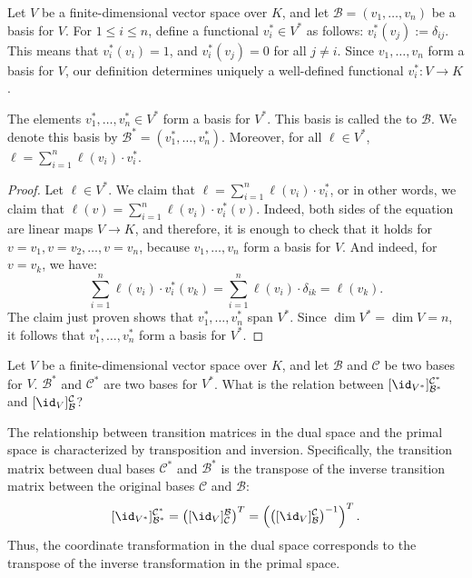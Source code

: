 Let $V$ be a finite-dimensional vector space over $K$, and let $\mathcal{B} = (v_1, \dots, v_n)$ be a basis for $V$. For $1 \leq i \leq n$, define a functional $v_i^* \in V^*$ as follows: $v_i^*(v_j) := \delta_{ij}$. This means that $v_i^*(v_i) = 1$, and $v_i^*(v_j) = 0$ for all $j \neq i$. Since $v_1, \dots, v_n$ form a basis for $V$, our definition determines uniquely a well-defined functional $v_i^* \colon V \to K$.

\begin{lemma}
  The elements $v_1^*, \dots, v_n^* \in V^*$ form a basis for $V^*$. This basis is called the  to $\mathcal{B}$. We denote this basis by $\mathcal{B}^* = (v_1^*, \dots, v_n^*)$. Moreover, for all $\ell \in V^*$, $\ell = \sum_{i=1}^n \ell(v_i) \cdot v_i^*$.
\end{lemma}

\begin{proof}
  Let $\ell \in V^*$. We claim that $\ell = \sum_{i=1}^n \ell(v_i) \cdot v_i^*$, or in other words, we claim that $\ell(v) = \sum_{i=1}^n \ell(v_i) \cdot v_i^*(v)$. Indeed, both sides of the equation are linear maps $V \to K$, and therefore, it is enough to check that it holds for $v = v_1, v = v_2, \dots, v = v_n$, because $v_1, \dots, v_n$ form a basis for $V$. And indeed, for $v = v_k$, we have:
  \[ \sum_{i=1}^n \ell(v_i) \cdot v_i^*(v_k) = \sum_{i=1}^n \ell(v_i) \cdot \delta_{ik} = \ell(v_k). \]
  The claim just proven shows that $v_1^*, \dots, v_n^*$ span $V^*$. Since $\dim V^* = \dim V = n$, it follows that $v_1^*, \dots, v_n^*$ form a basis for $V^*$.
\end{proof}

\begin{question}Let $V$ be a finite-dimensional vector space over $K$, and let $\mathcal{B}$ and $\mathcal{C}$ be two bases for $V$. $\mathcal{B}^*$ and $\mathcal{C}^*$ are two bases for $V^*$. What is the relation between $[\id_{V^*}]_{\mathcal{B}^*}^{\mathcal{C}^*}$ and $[\id_V]_{\mathcal{B}}^{\mathcal{C}}$?
\end{question}

\begin{proposition}
  The relationship between transition matrices in the dual space and the primal space is characterized by transposition and inversion. Specifically, the transition matrix between dual bases $\mathcal{C}^*$ and $\mathcal{B}^*$ is the transpose of the inverse transition matrix between the original bases $\mathcal{C}$ and $\mathcal{B}$:
  \[
  [\id_{V^*}]_{\mathcal{B}^*}^{\mathcal{C}^*} = \left( [\id_V]_{\mathcal{C}}^{\mathcal{B}} \right)^T = \left( \left( [\id_V]_{\mathcal{B}}^{\mathcal{C}} \right)^{-1} \right)^T.
  \]
  Thus, the coordinate transformation in the dual space corresponds to the transpose of the inverse transformation in the primal space.
\end{proposition}

